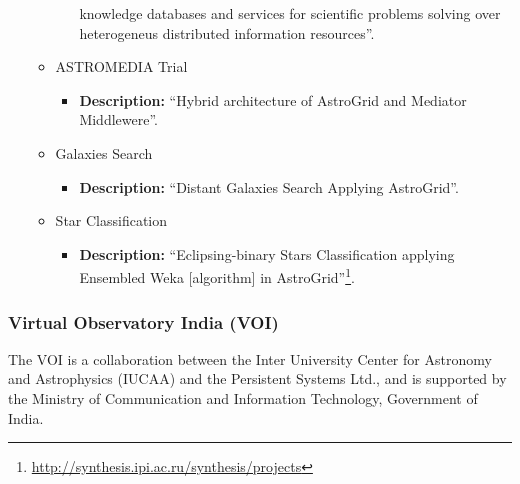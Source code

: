 \begin{itemize}
\begin{itemize}
\begin{itemize}
knowledge databases and services for scientific problems solving over
heterogeneus distributed information resources''.
\end{itemize}
\item ASTROMEDIA Trial
\begin{itemize}
\item \textbf{Description:} ``Hybrid architecture of AstroGrid and Mediator
Middlewere''.
\end{itemize}
\item Galaxies Search
\begin{itemize}
\item \textbf{Description:} ``Distant Galaxies Search Applying AstroGrid''.
\end{itemize}
\item Star Classification
\begin{itemize}
\item \textbf{Description:} ``Eclipsing-binary Stars Classification applying
Ensembled Weka [algorithm] in
AstroGrid''\footnote{\url{http://synthesis.ipi.ac.ru/synthesis/projects}}.
\end{itemize}
\end{itemize}
\end{itemize}

\subsubsection{Virtual Observatory India (VOI)}
The VOI \cite{website:voi-home} is a collaboration between the Inter University
Center for Astronomy and Astrophysics (IUCAA) and the Persistent Systems Ltd.,
and is supported by the Ministry of Communication and Information Technology,
Government of India.

